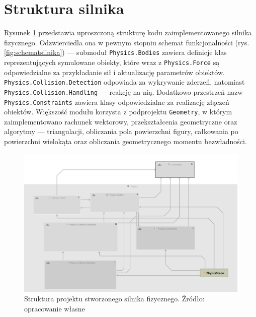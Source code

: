 \clearpage



\section{Struktura silnika}

Rysunek \ref{fig:schemat-silnika-vs} przedstawia uproszczoną strukturę kodu zaimplementowanego silnika fizycznego. Odzwierciedla ona w pewnym stopniu schemat funkcjonalności (rys. \ref{fig:schematsilnika}) --- submoduł \verb|Physics.Bodies| zawiera definicje klas reprezentujących symulowane obiekty, które wraz z \verb|Physics.Force| są odpowiedzialne za przykładanie sił i aktualizację parametrów obiektów. \verb|Physics.Collision.Detection| odpowiada za wykrywanie zderzeń, natomiast \verb|Physics.Collision.Handling| --- reakcję na nią. Dodatkowo przestrzeń nazw \verb|Physics.Constraints| zawiera klasy odpowiedzialne za realizację złączeń obiektów. Większość modułu korzysta z podprojektu \verb|Geometry|, w którym zaimplementowano rachunek wektorowy, przekształcenia geometryczne oraz algorytmy --- triangulacji, obliczania pola powierzchni figury, całkowania po powierzchni wielokąta oraz obliczania geometrycznego momentu bezwładności.
\begin{figure}[htb]
	\centering
	\includegraphics[width=\linewidth]{images/schemat-silnika-vs}
	\caption{Struktura projektu stworzonego silnika fizycznego. \newline
		Źródło: opracowanie własne
	}
	\label{fig:schemat-silnika-vs}
\end{figure}

